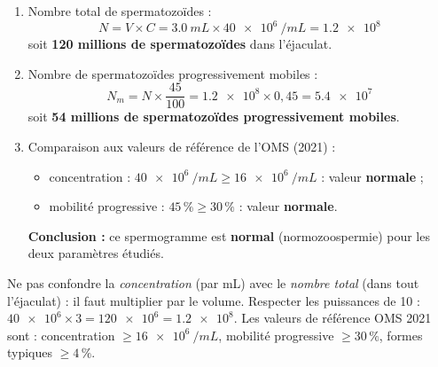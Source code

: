 \documentclass[11pt]{article}
\begin{document}
\begin{corrige}
\begin{enumerate}
\item Nombre total de spermatozoïdes :
\[ N = V \times C = \SI{3,0}{mL} \times \SI{40e6}{/mL} = \SI{1,2e8}{} \]
soit \textbf{120 millions de spermatozoïdes} dans l'éjaculat.
\item Nombre de spermatozoïdes progressivement mobiles :
\[ N_{m} = N \times \frac{45}{100} = \num{1,2e8} \times 0,45 = \SI{5,4e7}{} \]
soit \textbf{54 millions de spermatozoïdes progressivement mobiles}.
\item Comparaison aux valeurs de référence de l'OMS (2021) :
\begin{itemize}
\item concentration : $\SI{40e6}{/mL} \geq \SI{16e6}{/mL}$ : valeur \textbf{normale} ;
\item mobilité progressive : $45\,\% \geq 30\,\%$ : valeur \textbf{normale}.
\end{itemize}
\textbf{Conclusion :} ce spermogramme est \textbf{normal} (normozoospermie) pour les deux paramètres étudiés.
\end{enumerate}
\end{corrige}

\begin{attention}
Ne pas confondre la \emph{concentration} (par mL) avec le \emph{nombre total} (dans tout l'éjaculat) : il faut multiplier par le volume. Respecter les puissances de 10 : $\num{40e6} \times 3 = \num{120e6} = \num{1,2e8}$. Les valeurs de référence OMS 2021 sont : concentration $\ge \SI{16e6}{/mL}$, mobilité progressive $\ge 30\,\%$, formes typiques $\ge 4\,\%$.
\end{attention}
\end{document}
